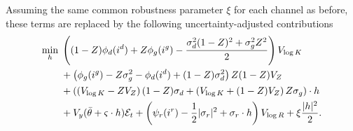 \documentclass[12pt]{article}
\begin{document}
\begin{appendices}
 
 Assuming the same common robustness parameter $\xi$ for each channel as before, these terms are replaced by the following uncertainty-adjusted contributions
\begin{equation*}
\begin{split}
\min_{h} \hspace{0.1cm} & \left((1-Z) \phi_d(i^{d})+Z \phi_g(i^{g}) -\frac{   \sigma_d^2 (1-Z)^2 + \sigma_g^2 Z^2 }{2} \right)V_{\log K} \\
 & +\left( \phi_g(i^{g}) - Z \sigma_g^2 -\phi_d(i^{d}) + (1-Z) \sigma_d^2  \right) Z (1-Z) V_{Z}\\
 & + \left( \left( V_{\log K} -  Z V_{Z} \right) (1-Z) \sigma_d  + \left( V_{\log K} + (1-Z) V_{Z} \right)  Z \sigma_g \right) \cdot h \\
 & + V_{y} (\bar{\theta} + \varsigma \cdot h) \mathcal{E}_t +\left(\psi_{r}(i^{r})-\frac{1}{2}|\sigma_{r}|^{2} + \sigma_{r} \cdot h \right) V_{\log R} + \xi \frac{|h|^2}{2}. 
\end{split}
\end{equation*}


\end{appendices}
\end{document}
